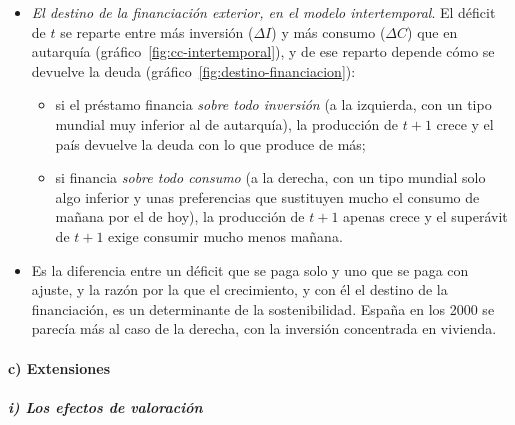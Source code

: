 \documentclass[11pt]{article}
\begin{document}
\begin{anotaciones}
\begin{itemize}
\item \emph{El destino de la financiación exterior, en el modelo intertemporal}. El déficit de $t$ se reparte entre más inversión ($\Delta I$) y más consumo ($\Delta C$) que en autarquía (gráfico~\ref{fig:cc-intertemporal}), y de ese reparto depende cómo se devuelve la deuda (gráfico~\ref{fig:destino-financiacion}):
  \begin{itemize}
  \item si el préstamo financia \emph{sobre todo inversión} (a la izquierda, con un tipo mundial muy inferior al de autarquía), la producción de $t+1$ crece y el país devuelve la deuda con lo que produce de más;
  \item si financia \emph{sobre todo consumo} (a la derecha, con un tipo mundial solo algo inferior y unas preferencias que sustituyen mucho el consumo de mañana por el de hoy), la producción de $t+1$ apenas crece y el superávit de $t+1$ exige consumir mucho menos mañana.
  \end{itemize}
\item Es la diferencia entre un déficit que se paga solo y uno que se paga con ajuste, y la razón por la que el crecimiento, y con él el destino de la financiación, es un determinante de la sostenibilidad. España en los 2000 se parecía más al caso de la derecha, con la inversión concentrada en vivienda.
\end{itemize}
\begin{figuracaja}
\caption{El destino de la financiación exterior: inversión o consumo}\label{fig:destino-financiacion}
\end{figuracaja}
\end{anotaciones}

\paragraph{c) Extensiones}

\subparagraph{i) Los efectos de valoración}
\end{document}
